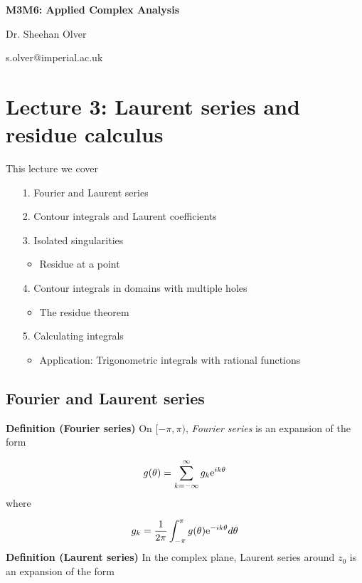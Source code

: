 \documentclass[12pt,a4paper]{article}
\def\E{ {\rm e} }
\begin{document}
\textbf{M3M6: Applied Complex Analysis}

Dr. Sheehan Olver

s.olver@imperial.ac.uk

\section{Lecture 3: Laurent series and residue calculus}
This lecture we cover

\begin{itemize}
\item[1. ] Fourier and Laurent series


\item[2. ] Contour integrals and Laurent coefficients


\item[3. ] Isolated singularities

\begin{itemize}
\item Residue at a point

\end{itemize}

\item[4. ] Contour integrals in domains with multiple holes

\begin{itemize}
\item The residue theorem

\end{itemize}

\item[5. ] Calculating integrals

\begin{itemize}
\item Application: Trigonometric integrals with rational functions

\end{itemize}
\end{itemize}
\subsection{Fourier and Laurent series}
\textbf{Definition (Fourier series)} On $[-\pi, \pi)$,  \emph{Fourier series} is an expansion of the form

\[
    g(\theta) = \sum_{k=-\infty}^\infty g_k \E^{i k \theta}
\]
where

\[
g_k = {1\over 2 \pi} \int_{-\pi}^\pi g(\theta) \E^{-i k \theta} d \theta
\]
\textbf{Definition (Laurent series)} In the complex plane, Laurent series around $z_0$ is an expansion of the form 
\end{document}
